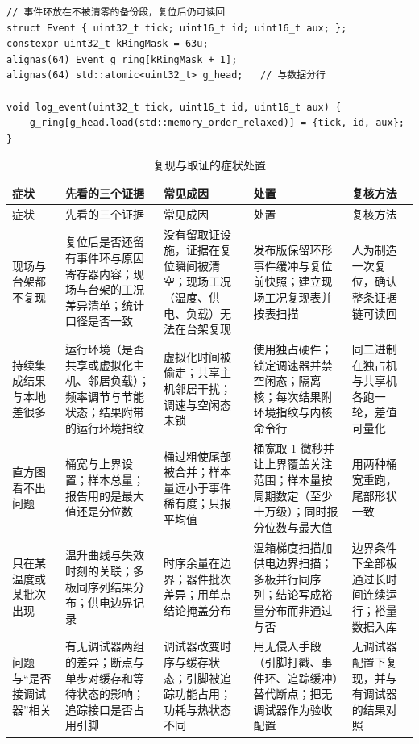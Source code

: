\documentclass[12pt,a4paper,fontset=fandol]{ctexbook}
\begin{document}
\begin{lstlisting}[style=cppstyle,caption={发布版可保留的最小取证设施：事件环},label={lst:apC-evidence}]
// 事件环放在不被清零的备份段，复位后仍可读回
struct Event { uint32_t tick; uint16_t id; uint16_t aux; };
constexpr uint32_t kRingMask = 63u;
alignas(64) Event g_ring[kRingMask + 1];
alignas(64) std::atomic<uint32_t> g_head;   // 与数据分行

void log_event(uint32_t tick, uint16_t id, uint16_t aux) {
    g_ring[g_head.load(std::memory_order_relaxed)] = {tick, id, aux};
}
\end{lstlisting}

\begin{longtable}{>{\raggedright\arraybackslash\footnotesize}p{}>{\raggedright\arraybackslash\footnotesize}p{}>{\raggedright\arraybackslash\footnotesize}p{}>{\raggedright\arraybackslash\footnotesize}p{}>{\raggedright\arraybackslash\footnotesize}p{}}
\caption{复现与取证的症状处置}\label{tab:apC-repro} \\
\toprule
症状 & 先看的三个证据 & 常见成因 & 处置 & 复核方法 \\
\midrule
\endfirsthead
\toprule
症状 & 先看的三个证据 & 常见成因 & 处置 & 复核方法 \\
\midrule
\endhead
\bottomrule
\endfoot
\endlastfoot
现场与台架都不复现 & 复位后是否还留有事件环与原因寄存器内容；现场与台架的工况差异清单；统计口径是否一致 & 没有留取证设施，证据在复位瞬间被清空；现场工况（温度、供电、负载）无法在台架复现 & 发布版保留环形事件缓冲与复位前快照；建立现场工况复现表并按表扫描 & 人为制造一次复位，确认整条证据链可读回 \\
持续集成结果与本地差很多 & 运行环境（是否共享或虚拟化主机、邻居负载）；频率调节与节能状态；结果附带的运行环境指纹 & 虚拟化时间被偷走；共享主机邻居干扰；调速与空闲态未锁 & 使用独占硬件；锁定调速器并禁空闲态；隔离核；每次结果附环境指纹与内核命令行 & 同二进制在独占机与共享机各跑一轮，差值可量化 \\
直方图看不出问题 & 桶宽与上界设置；样本总量；报告用的是最大值还是分位数 & 桶过粗使尾部被合并；样本量远小于事件稀有度；只报平均值 & 桶宽取 1 微秒并让上界覆盖关注范围；样本量按周期数定（至少十万级）；同时报分位数与最大值 & 用两种桶宽重跑，尾部形状一致 \\
只在某温度或某批次出现 & 温升曲线与失效时刻的关联；多板同序列结果分布；供电边界记录 & 时序余量在边界；器件批次差异；用单点结论掩盖分布 & 温箱梯度扫描加供电边界扫描；多板并行同序列；结论写成裕量分布而非通过与否 & 边界条件下全部板通过长时间连续运行；裕量数据入库 \\
问题与``是否接调试器''相关 & 有无调试器两组的差异；断点与单步对缓存和等待状态的影响；追踪接口是否占用引脚 & 调试器改变时序与缓存状态；引脚被追踪功能占用；功耗与热状态不同 & 用无侵入手段（引脚打戳、事件环、追踪缓冲）替代断点；把无调试器作为验收配置 & 无调试器配置下复现，并与有调试器的结果对照 \\
\end{longtable}
\end{document}

